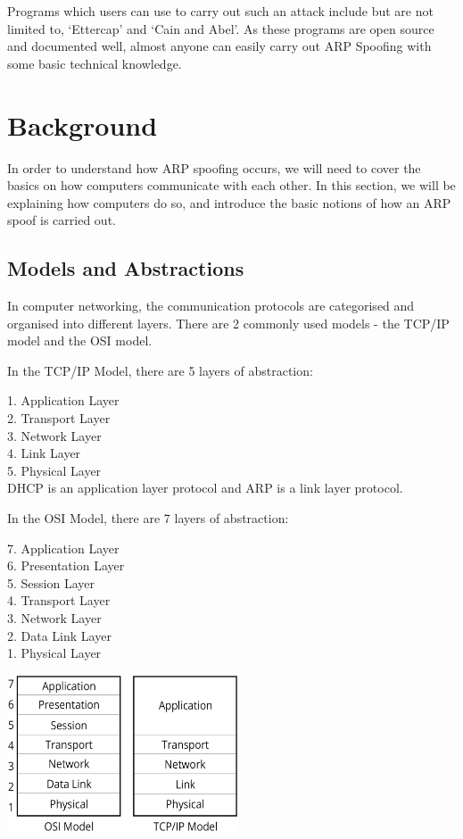 \documentclass{acm_proc_article-sp}
\begin{document}
Programs which users can use to carry out such an attack include but are not limited to, `Ettercap' and `Cain and Abel'. As these programs are open source and documented well, almost anyone can easily carry out ARP Spoofing with some basic technical knowledge. 

\newpage

\section{Background}
In order to understand how ARP spoofing occurs, we will need to cover the basics on how computers communicate with each other. In this section, we will be explaining how computers do so, and introduce the basic notions of how an ARP spoof is carried out. 

\subsection{Models and Abstractions}
In computer networking, the communication protocols are categorised and organised into different layers. There are 2 commonly used models - the TCP/IP model and the OSI model. 

In the TCP/IP Model, there are 5 layers of abstraction: 

1. Application Layer\\
2. Transport Layer\\
3. Network Layer\\
4. Link Layer\\
5. Physical Layer\\

DHCP is an application layer protocol and ARP is a link layer protocol.

In the OSI Model, there are 7 layers of abstraction:

7. Application Layer \\
6. Presentation Layer \\
5. Session Layer \\
4. Transport Layer \\
3. Network Layer \\
2. Data Link Layer \\
1. Physical Layer 

\includegraphics[width=2.7in]{osi_comparison.eps}
\end{document}
